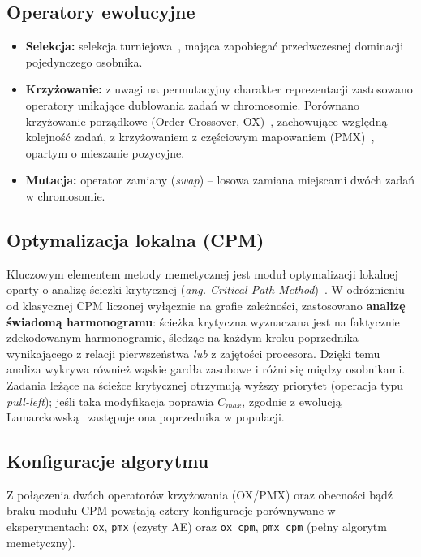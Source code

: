 \documentclass[12pt,a4paper]{article}
\begin{document}
\subsection{Operatory ewolucyjne}
\begin{itemize}[itemsep=3pt, topsep=3pt]
    \item \textbf{Selekcja:} selekcja turniejowa~\cite{miller1995}, mająca zapobiegać przedwczesnej dominacji pojedynczego osobnika.
    \item \textbf{Krzyżowanie:} z uwagi na permutacyjny charakter reprezentacji zastosowano operatory unikające dublowania zadań w chromosomie. Porównano krzyżowanie porządkowe (Order Crossover, OX)~\cite{davis1985}, zachowujące względną kolejność zadań, z krzyżowaniem z częściowym mapowaniem (PMX)~\cite{goldberg1985}, opartym o mieszanie pozycyjne.
    \item \textbf{Mutacja:} operator zamiany (\textit{swap}) -- losowa zamiana miejscami dwóch zadań w chromosomie.
\end{itemize}

\subsection{Optymalizacja lokalna (CPM)}
Kluczowym elementem metody memetycznej jest moduł optymalizacji lokalnej oparty o analizę ścieżki krytycznej (\textit{ang. Critical Path Method})~\cite{kelley1959}. W odróżnieniu od klasycznej CPM liczonej wyłącznie na grafie zależności, zastosowano \textbf{analizę świadomą harmonogramu}: ścieżka krytyczna wyznaczana jest na faktycznie zdekodowanym harmonogramie, śledząc na każdym kroku poprzednika wynikającego z relacji pierwszeństwa \emph{lub} z zajętości procesora. Dzięki temu analiza wykrywa również wąskie gardła zasobowe i różni się między osobnikami. Zadania leżące na ścieżce krytycznej otrzymują wyższy priorytet (operacja typu \textit{pull-left}); jeśli taka modyfikacja poprawia $C_{max}$, zgodnie z ewolucją Lamarckowską~\cite{whitley1994} zastępuje ona poprzednika w populacji.

\subsection{Konfiguracje algorytmu}
Z połączenia dwóch operatorów krzyżowania (OX/PMX) oraz obecności bądź braku modułu CPM powstają cztery konfiguracje porównywane w eksperymentach: \texttt{ox}, \texttt{pmx} (czysty AE) oraz \texttt{ox\_cpm}, \texttt{pmx\_cpm} (pełny algorytm memetyczny).
\end{document}
